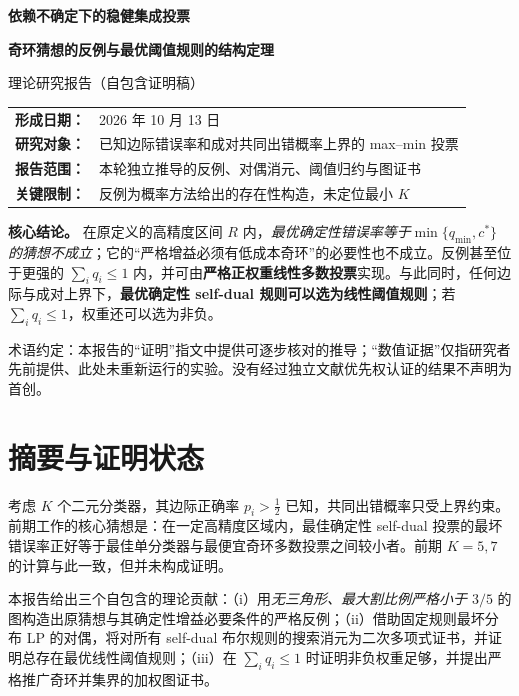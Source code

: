 \documentclass[11pt,a4paper]{ctexart}
\theoremstyle{definition}
\begin{document}
\thispagestyle{empty}
\vspace*{1.8cm}
\noindent{\color{accent}\rule{\textwidth}{1.6pt}}\par
\vspace{0.7cm}
{\Huge\bfseries 依赖不确定下的稳健集成投票}\par
\vspace{0.4cm}
{\LARGE\bfseries 奇环猜想的反例与最优阈值规则的结构定理}\par
\vspace{0.9cm}
{\Large 理论研究报告（自包含证明稿）}\par
\vspace{1.2cm}
\begin{tabular}{@{}ll@{}}
\textbf{形成日期：}& 2026 年 10 月 13 日\\
\textbf{研究对象：}& 已知边际错误率和成对共同出错概率上界的 max--min 投票\\
\textbf{报告范围：}& 本轮独立推导的反例、对偶消元、阈值归约与图证书\\
\textbf{关键限制：}& 反例为概率方法给出的存在性构造，未定位最小 $K$\\
\end{tabular}
\vfill
\begin{resultbox}
\textbf{核心结论。} 在原定义的高精度区间 $R$ 内，\emph{最优确定性错误率等于}\nobreakspace$\min\{q_{\min},c^*\}$ \emph{的猜想不成立}；它的“严格增益必须有低成本奇环”的必要性也不成立。反例甚至位于更强的 $\sum_iq_i\le1$ 内，并可由\textbf{严格正权重线性多数投票}实现。与此同时，任何边际与成对上界下，\textbf{最优确定性 self-dual 规则可以选为线性阈值规则}；若 $\sum_iq_i\le1$，权重还可以选为非负。
\end{resultbox}
\vspace{0.5cm}
{\small\color{gray} 术语约定：本报告的“证明”指文中提供可逐步核对的推导；“数值证据”仅指研究者先前提供、此处未重新运行的实验。没有经过独立文献优先权认证的结果不声明为首创。}
\newpage
\tableofcontents
\newpage

\section{摘要与证明状态}
考虑 $K$ 个二元分类器，其边际正确率 $p_i>\tfrac12$ 已知，共同出错概率只受上界约束。前期工作的核心猜想是：在一定高精度区域内，最佳确定性 self-dual 投票的最坏错误率正好等于最佳单分类器与最便宜奇环多数投票之间较小者。前期 $K=5,7$ 的计算与此一致，但并未构成证明。

本报告给出三个自包含的理论贡献：（i）用\emph{无三角形、最大割比例严格小于 $3/5$} 的图构造出原猜想与其确定性增益必要条件的严格反例；（ii）借助固定规则最坏分布 LP 的对偶，将对所有 self-dual 布尔规则的搜索消元为二次多项式证书，并证明总存在最优线性阈值规则；（iii）在 $\sum_iq_i\le1$ 时证明非负权重足够，并提出严格推广奇环并集界的加权图证书。
\end{document}
